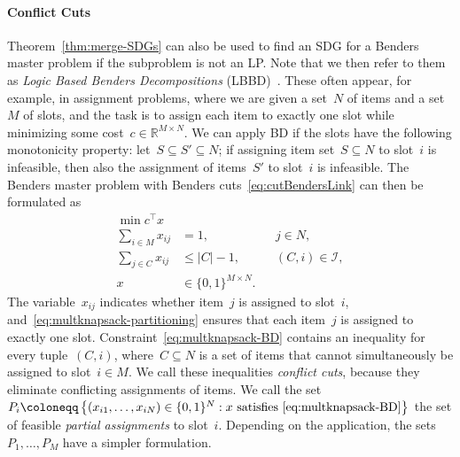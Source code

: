 \documentclass[a4paper,10pt]{article}
\newcommand{\R}{\mathds{R}}
\newcommand{\B}[1]{\{0,1\}^{#1}}
\newcommand{\sprod}[2]{#1^\top #2}
\newcommand{\define}{\coloneqq}
\newcommand{\brackets}[1]{\left\{ #1 \right\}}
\theoremstyle{definition}
\begin{document}
\paragraph{Conflict Cuts}
Theorem~\ref{thm:merge-SDGs} can also be used to find an SDG for a Benders master problem if the subproblem is not an LP.
Note that we then refer to them as \emph{Logic Based Benders Decompositions} (LBBD)~\cite{hooker2003logic}.
These often appear, for example, in assignment problems, where we are given a set~$N$ of items and a set~$M$ of slots, and the task is to assign each item to exactly one slot while minimizing some cost~$c \in \R^{M \times N}$.
We can apply BD if the slots have the following monotonicity property: let~$S \subseteq S' \subseteq N$;
if assigning item set~$S\subseteq N$ to slot~$i$ is infeasible, then also the assignment of items~$S'$ to slot~$i$ is infeasible.
The Benders master problem with Benders cuts~\eqref{eq:cutBendersLink} can then be formulated as
%
\begin{subequations}
  \label{eq:naive-MK}
  \begin{align}
    \min \sprod{c}{x} & \\
    \sum_{i \in M} x_{ij} &= 1, && j \in N, \label{eq:multknapsack-partitioning}\\
    \sum_{j\in C} x_{ij} &\leq |C| -1, && (C, i) \in \mathcal{I}, \label{eq:multknapsack-BD} \\
    x &\in \B{M\times N}.
  \end{align}
\end{subequations}
%
The variable~$x_{ij}$ indicates whether item~$j$ is assigned to slot~$i$, and~\eqref{eq:multknapsack-partitioning} ensures that each item~$j$ is assigned to exactly one slot.
Constraint~\eqref{eq:multknapsack-BD} contains an inequality for every tuple~$(C,i)$, where~${C \subseteq N}$ is a set of items that cannot simultaneously be assigned to slot~$i \in M$.
We call these inequalities \emph{conflict cuts}, because they eliminate conflicting assignments of items.
We call the set~$P_i \define \brackets{(x_{i1}, \dots, x_{iN})\in\B{N} : x\text{ satisfies }\eqref{eq:multknapsack-BD}}$ the set of feasible \emph{partial assignments} to slot~$i$.
Depending on the application, the sets~$P_1, \dots, P_M$ have a simpler formulation.
\end{document}
